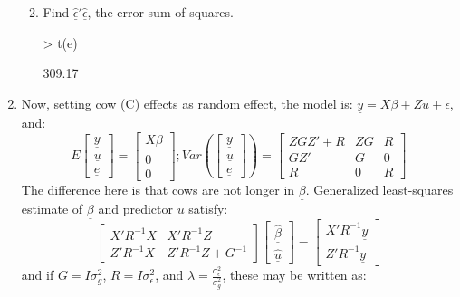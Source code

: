 \documentclass[12pt,a4paper]{paper}
\begin{document}
\begin{enumerate}
\begin{enumerate}
\begin{Schunk}
\end{Schunk}
\item Find $\underline{\hat{\epsilon}}'\underline{\hat{\epsilon}}$, the error sum of squares.
\begin{Schunk}
\begin{Sinput}
> t(e) %*% e
\end{Sinput}
\begin{Soutput}
       [,1]
[1,] 309.17
\end{Soutput}
\end{Schunk}
\end{enumerate}
\item Now, setting cow (C) effects as random effect, the model is: $\underline{y} = X\beta + Zu + \epsilon$, and: \[E\left[\begin{array}{c}\underline{y}\\\underline{u}\\\underline{e}\end{array}\right] = \left[\begin{array}{c}X\underline{\beta}\\0\\0\end{array}\right]; Var\left(\left[\begin{array}{c}\underline{y}\\\underline{u}\\\underline{e}\end{array}\right]\right) = \left[\begin{array}{ccc}ZGZ' + R & ZG & R\\GZ' & G & 0\\R & 0 & R\end{array}\right]\] The difference here is that cows are not longer in $\underline{\beta}$. Generalized least-squares estimate of $\underline{\beta}$ and predictor $\underline{u}$ satisfy: \[\left[\begin{array}{cc} X'R^{-1}X & X'R^{-1}Z\\Z'R^{-1}X & Z'R^{-1}Z + G^{-1}\end{array}\right]\left[\begin{array}{c}\underline{\hat{\beta}}\\\underline{\hat{u}}\end{array}\right] = \left[\begin{array}{c}X'R^{-1}\underline{y}\\Z'R^{-1}\underline{y}\end{array}\right]\]
and if $G = I\sigma^{2}_{g}$, $R = I\sigma_{\epsilon}^{2}$, and $\lambda = \frac{\sigma^{2}_{\epsilon}}{\sigma^{2}_{g}}$, these may be written as: 

\end{enumerate}
\end{document}
